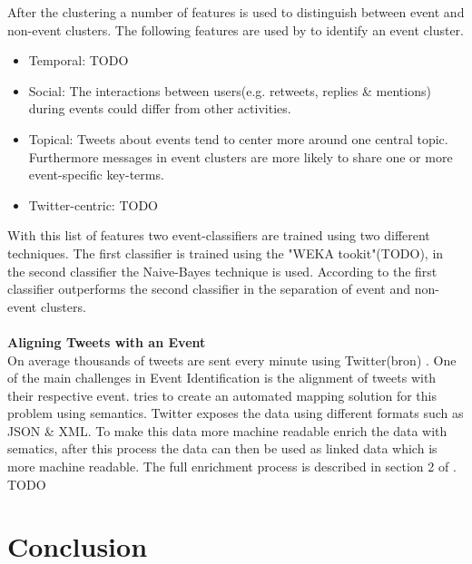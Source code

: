 \documentclass{article}
\begin{document}
After the clustering a number of features is used to distinguish between event and non-event clusters. The following features are used by \cite{eventident} to identify an event cluster. 
\begin{itemize}
  \item Temporal: TODO
  \item Social: The interactions between users(e.g. retweets, replies \& mentions) during events could differ from other activities. 
  \item Topical: Tweets about events tend to center more around one central topic. Furthermore messages in event clusters are more likely to share one or more event-specific key-terms.  
  \item Twitter-centric: TODO
\end{itemize}
With this list of features two event-classifiers are trained using two different techniques. The first classifier is trained using the "WEKA tookit"(TODO), in the second classifier the  Naive-Bayes technique is used. According to \cite{eventident} the first classifier outperforms the second classifier in the separation of event and non-event clusters. 
\\\\
\textbf{Aligning Tweets with an Event} \\
On average thousands of tweets are sent every minute using Twitter(bron) . One of the main challenges in Event Identification is the alignment of tweets with their respective event. \cite{eventalign} tries to create an automated mapping solution for this problem using semantics.  
Twitter exposes the data using different formats such as JSON \& XML. To make this data more machine readable \cite{eventalign} enrich the data with sematics, after this process the data can then  be used as linked data which is more machine readable. The full enrichment process is described in section 2 of \cite{eventalign}. 
TODO
\section{Conclusion}



\end{document}
